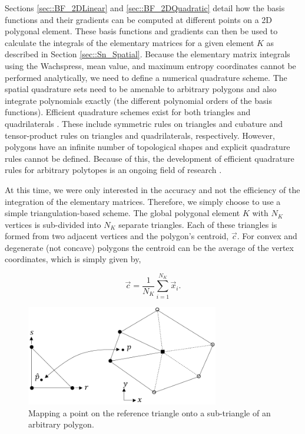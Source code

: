 Sections \ref{sec::BF_2DLinear} and \ref{sec::BF_2DQuadratic} detail how the basis functions and their gradients can be computed at different points on a 2D polygonal element. These basis functions and gradients can then be used to calculate the integrals of the elementary matrices for a given element $K$ as described in Section \ref{sec::Sn_Spatial}. Because the elementary matrix integrals using the Wachspress, mean value, and maximum entropy coordinates cannot be performed analytically, we need to define a numerical quadrature scheme. The spatial quadrature sets need to be amenable to arbitrary polygons and also integrate polynomials exactly (the different polynomial orders of the basis functions). Efficient quadrature schemes exist for both triangles and quadrilaterals \cite{silvester1970symmetric,dunavant1985high,wandzurat2003symmetric,lyness1994survey,cools1987construction}. These include symmetric rules on triangles and cubature and tensor-product rules on triangles and quadrilaterals, respectively. However, polygons have an infinite number of topological shapes and explicit quadrature rules cannot be defined. Because of this, the development of efficient quadrature rules for arbitrary polytopes is an ongoing field of research \cite{nooijen1990symmetric,dasgupta2003integration,mousavi2010generalized}.

At this time, we were only interested in the accuracy and not the efficiency of the integration of the elementary matrices. Therefore, we simply choose to use a simple triangulation-based scheme. The global polygonal element $K$ with $N_K$ vertices is sub-divided into $N_K$ separate triangles. Each of these triangles is formed from two adjacent vertices and the polygon's centroid, $\vec{c}$. For convex and degenerate (not concave) polygons the centroid can be the average of the vertex coordinates, which is simply given by,

\begin{equation}
\label{eq::BF_2DInt_centroid}
\vec{c} = \frac{1}{N_K} \sum_{i=1}^{N_K} \vec{x}_i .
\end{equation}

\begin{figure}
\centering
\includegraphics[width=0.75\textwidth]{figures/sec_BF/triangle_mapping_Rev1.png}
\caption{Mapping a point on the reference triangle onto a sub-triangle of an arbitrary polygon.}
\label{fig::BF_2D_tri_mapping}
\end{figure}

